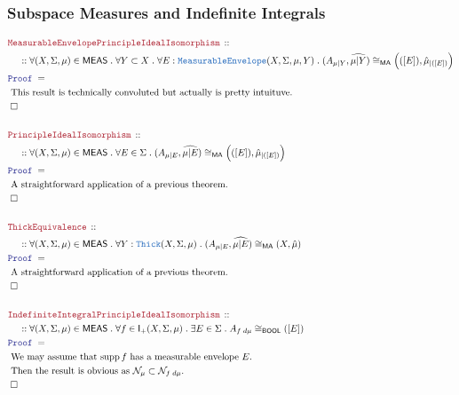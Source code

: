 \documentclass[12pt]{scrartcl}
\newcommand{\TYPE}[1]{\textcolor{NavyBlue}{\mathtt{#1}}}
\newcommand{\LOGIC}[1]{\textcolor{Blue}{\mathtt{#1}}}
\newcommand{\THM}[1]{\textcolor{Maroon}{\mathtt{#1}}}
\renewcommand{\.}{\; . \;}
\newcommand{\Theorem}[2]{& \THM{#1} \, :: \, #2 \\ & \Proof = \\ }
\newcommand{\NewLine}{\\ & \kern 1pc}
\newcommand{\Page}[1]{ \begin{align*} #1 \end{align*}   }
\DeclareMathOperator*{\supp}{supp}
\newcommand{\QED}{\; \square}
\newcommand{\EndProof}{& \QED \\}
\newcommand{\Proof}{\LOGIC{Proof} \; }
\newcommand{\Explain}[1]{& \text{#1.} \\}
\newcommand{\BOOL}{\mathsf{BOOL}}
\newcommand{\Null}{\mathcal{N}}
\newcommand{\Thick}{\TYPE{Thick}}
\newcommand{\Integrable}{\mathsf{I}}
\newcommand{\ME}{\TYPE{MeasurableEnvelope}}
\newcommand{\MEAS}{\mathsf{MEAS}}
\begin{document}
\subsubsection{Subspace Measures and Indefinite Integrals}
\Page{
	\Theorem{MeasurableEnvelopePrincipleIdealIsomorphism}
	{
		\NewLine ::		
		\forall (X,\Sigma,\mu) \in \MEAS \.
		\forall Y \subset X \.
		\forall E : \ME(X,\Sigma,\mu,Y) \.  
		(A_{\mu|Y},\widehat{\mu|Y}) \cong_{\mathsf{MA}}  \Big( ([E]), \hat \mu_{|([E])} \Big)
	}
	\Explain{ This result is technically convoluted but actually is pretty intuituve}
	\EndProof
	\\
	\Theorem{PrincipleIdealIsomorphism}
	{
		\NewLine ::		
		\forall (X,\Sigma,\mu) \in \MEAS \.
		\forall E \in \Sigma \.  
		(A_{\mu|E},\widehat{\mu|E}) \cong_{\mathsf{MA}}  \Big( ([E]), \hat \mu_{|([E])} \Big)
	}
	\Explain{ A straightforward application of  a previous theorem}
	\EndProof
	\\
	\Theorem{ThickEquivalence}
	{
		\NewLine ::		
		\forall (X,\Sigma,\mu) \in \MEAS \.
		\forall Y : \Thick(X,\Sigma,\mu) \.  
		(A_{\mu|E},\widehat{\mu|E}) \cong_{\mathsf{MA}}  ( X, \hat \mu )
	}
	\Explain{ A straightforward application of a previous theorem}
	\EndProof
	\\
	\Theorem{IndefiniteIntegralPrincipleIdealIsomorphism}
	{
		\NewLine ::		
		\forall (X,\Sigma,\mu) \in \MEAS \.
		\forall f \in \Integrable_+(X,\Sigma,\mu)  \.
		\exists E \in \Sigma \.
		A_{f\;d\mu} \cong_\BOOL ([E])
	}
	\Explain{ We may assume that $\supp f$ has a measurable envelope $E$}
	\Explain{ Then the result is obvious as $\Null_{\mu} \subset \Null_{f\;d\mu}$}
	\EndProof
}
\newpage
\end{document}
